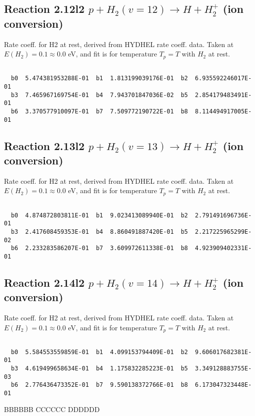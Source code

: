 \newpage
\subsection{
Reaction 2.12l2
$ p + H_2(v=12) \rightarrow H + H_2^+$ (ion conversion)
}
Rate coeff. for H2 at rest, derived from HYDHEL rate coeff. data.
Taken at $E(H_2) = 0.1 \approx 0.0$ eV,  and fit is for temperature $T_p=T$ with $H_2$ at rest.

\begin{small}\begin{verbatim}

  b0  5.474381953288E-01  b1  1.813199039176E-01  b2  6.935592246017E-01
  b3  7.465967169754E-01  b4  7.943701847036E-02  b5  2.854179483491E-01
  b6  3.370577910097E-01  b7  7.509772190722E-01  b8  8.114494917005E-01

\end{verbatim}\end{small}

\newpage
\subsection{
Reaction 2.13l2
$ p + H_2(v=13) \rightarrow H + H_2^+$ (ion conversion)
}
Rate coeff. for H2 at rest, derived from HYDHEL rate coeff. data.
Taken at $E(H_2) = 0.1 \approx 0.0$ eV,  and fit is for temperature $T_p=T$ with $H_2$ at rest.

\begin{small}\begin{verbatim}

  b0  4.874872803811E-01  b1  9.023413089940E-01  b2  2.791491696736E-01
  b3  2.417608459353E-01  b4  8.860491887420E-01  b5  2.217225965299E-02
  b6  2.233283586207E-01  b7  3.609972611338E-01  b8  4.923909402331E-01

\end{verbatim}\end{small}

\newpage
\subsection{
Reaction 2.14l2
$ p + H_2(v=14) \rightarrow H + H_2^+$ (ion conversion)
}
Rate coeff. for H2 at rest, derived from HYDHEL rate coeff. data.
Taken at $E(H_2) = 0.1 \approx 0.0$ eV,  and fit is for temperature $T_p=T$ with $H_2$ at rest.

\begin{small}\begin{verbatim}

  b0  5.584553559859E-01  b1  4.099153794409E-01  b2  9.606017682381E-01
  b3  4.619499658634E-01  b4  1.175832285223E-01  b5  3.349128883755E-03
  b6  2.776436473352E-01  b7  9.590138372766E-01  b8  6.173047323448E-01

\end{verbatim}\end{small}

\newpage

BBBBBB
CCCCCC
DDDDDD
